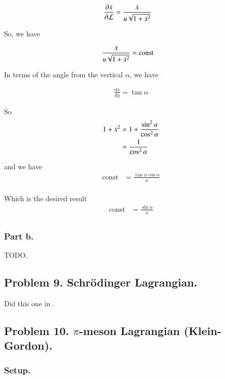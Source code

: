 \documentclass{article}
\begin{document}
\begin{align*}
\frac{\partial{\dot{x}}}{\partial {\mathcal{L}}} &= \frac{\dot{x}}{u \sqrt{1 + \dot{x}^2} }
\end{align*}

So, we have

\begin{align*}
\frac{\dot{x}}{u \sqrt{1 + \dot{x}^2} } &= \text{const}
\end{align*}

In terms of the angle from the vertical $\alpha$, we have

\begin{align*}
\frac{dx}{dy} = \tan\alpha 
\end{align*}

So
\begin{align*}
1 + \dot{x}^2 
&= 1 + \frac{\sin^2\alpha}{\cos^2\alpha} \\
&= \frac{1}{\cos^2\alpha} \\
\end{align*}

and we have
\begin{align*}
\text{const}
&= 
\frac{\tan\alpha \cos\alpha}{u}  \\
\end{align*}

Which is the desired result
\begin{align*}
\text{const} &= \frac{\sin\alpha}{u} \\
\end{align*}

\subsubsection{ Part b. }

TODO.

\subsection{ Problem 9.  Schr\"{o}dinger Lagrangian. }

Did this one in \cite{PJgoldch1}.

\subsection{ Problem 10.  $\pi$-meson Lagrangian (Klein-Gordon). }

\subsubsection{ Setup. }
\end{document}
